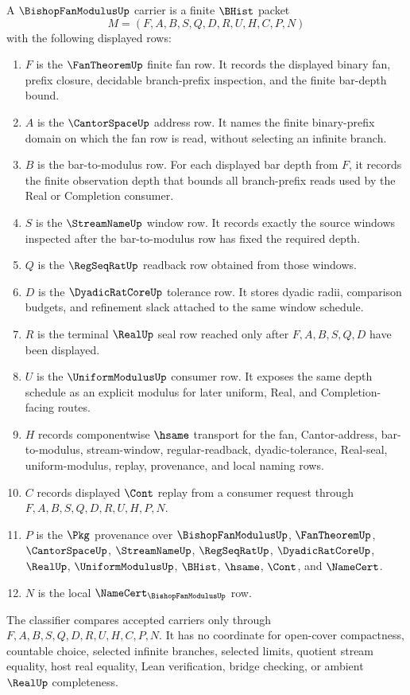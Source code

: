 \begin{definition}
\label{def:bishop-fan-modulus-carrier}
A $\BishopFanModulusUp$ carrier is a finite $\BHist$ packet
$$
M=(F,A,B,S,Q,D,R,U,H,C,P,N)
$$
with the following displayed rows:
\begin{enumerate}
\item $F$ is the $\FanTheoremUp$ finite fan row. It records the displayed binary fan, prefix closure, decidable branch-prefix inspection, and the finite bar-depth bound.
\item $A$ is the $\CantorSpaceUp$ address row. It names the finite binary-prefix domain on which the fan row is read, without selecting an infinite branch.
\item $B$ is the bar-to-modulus row. For each displayed bar depth from $F$, it records the finite observation depth that bounds all branch-prefix reads used by the Real or Completion consumer.
\item $S$ is the $\StreamNameUp$ window row. It records exactly the source windows inspected after the bar-to-modulus row has fixed the required depth.
\item $Q$ is the $\RegSeqRatUp$ readback row obtained from those windows.
\item $D$ is the $\DyadicRatCoreUp$ tolerance row. It stores dyadic radii, comparison budgets, and refinement slack attached to the same window schedule.
\item $R$ is the terminal $\RealUp$ seal row reached only after $F,A,B,S,Q,D$ have been displayed.
\item $U$ is the $\UniformModulusUp$ consumer row. It exposes the same depth schedule as an explicit modulus for later uniform, Real, and Completion-facing routes.
\item $H$ records componentwise $\hsame$ transport for the fan, Cantor-address, bar-to-modulus, stream-window, regular-readback, dyadic-tolerance, Real-seal, uniform-modulus, replay, provenance, and local naming rows.
\item $C$ records displayed $\Cont$ replay from a consumer request through $F,A,B,S,Q,D,R,U,H,P,N$.
\item $P$ is the $\Pkg$ provenance over $\BishopFanModulusUp$, $\FanTheoremUp$, $\CantorSpaceUp$, $\StreamNameUp$, $\RegSeqRatUp$, $\DyadicRatCoreUp$, $\RealUp$, $\UniformModulusUp$, $\BHist$, $\hsame$, $\Cont$, and $\NameCert$.
\item $N$ is the local $\NameCert_{\BishopFanModulusUp}$ row.
\end{enumerate}
The classifier compares accepted carriers only through $F,A,B,S,Q,D,R,U,H,C,P,N$. It has no coordinate for open-cover compactness, countable choice, selected infinite branches, selected limits, quotient stream equality, host real equality, Lean verification, bridge checking, or ambient $\RealUp$ completeness.
\end{definition}

